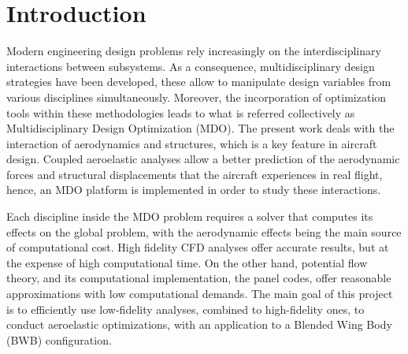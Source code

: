 \section{Introduction}
\label{sec:intro}
Modern engineering design problems rely increasingly on the interdisciplinary interactions between subsystems. As a consequence, multidisciplinary design strategies have been developed, these allow to manipulate design variables from various disciplines simultaneously. Moreover, the incorporation of optimization tools within these methodologies leads to what is referred collectively as Multidisciplinary Design Optimization (MDO).    
The present work deals with the interaction of aerodynamics and structures, which is a key feature in aircraft design. Coupled aeroelastic analyses allow a better prediction of the aerodynamic forces and structural displacements that the aircraft experiences in real flight, hence, an MDO platform is implemented in order to study these interactions. \par 
Each discipline inside the MDO problem requires a solver that computes its effects on the global problem, with the aerodynamic effects being the main source of computational cost. High fidelity CFD analyses offer accurate results, but at the expense of high computational time. On the other hand, potential flow theory, and its computational implementation, the panel codes, offer reasonable approximations with low computational demands. The main goal of this project is to efficiently use low-fidelity analyses, combined to high-fidelity ones, to conduct aeroelastic optimizations, with an application to a Blended Wing Body (BWB) configuration.  
